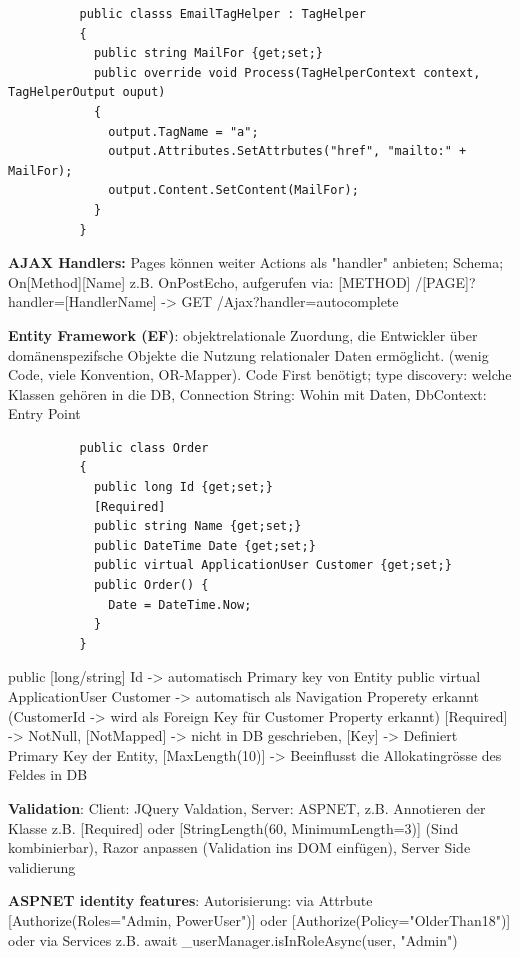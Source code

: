 \documentclass[10pt,landscape]{article}
\begin{document}
\begin{multicols}{3}
\begin{lstlisting}
          public classs EmailTagHelper : TagHelper 
          {
            public string MailFor {get;set;}
            public override void Process(TagHelperContext context, TagHelperOutput ouput)
            {
              output.TagName = "a";
              output.Attributes.SetAttrbutes("href", "mailto:" + MailFor);
              output.Content.SetContent(MailFor);
            }
          }
        \end{lstlisting}
        \textbf{AJAX Handlers:} Pages können weiter Actions als "handler" anbieten; Schema; On[Method][Name] z.B. OnPostEcho, aufgerufen via: [METHOD] /[PAGE]?handler=[HandlerName] -> GET /Ajax?handler=autocomplete

        \textbf{Entity Framework (EF)}: objektrelationale Zuordung, die Entwickler über domänenspezifsche Objekte die Nutzung relationaler Daten ermöglicht. (wenig Code, viele Konvention, OR-Mapper).
        Code First benötigt; type discovery: welche Klassen gehören in die DB, Connection String: Wohin mit Daten, DbContext: Entry Point
        \begin{lstlisting}
          public class Order
          {
            public long Id {get;set;}
            [Required]
            public string Name {get;set;}
            public DateTime Date {get;set;}
            public virtual ApplicationUser Customer {get;set;}
            public Order() {
              Date = DateTime.Now;
            }
          }
        \end{lstlisting}
        public [long/string] Id -> automatisch Primary key von Entity
        public virtual ApplicationUser Customer -> automatisch als Navigation Properety erkannt (CustomerId -> wird als Foreign Key für Customer Property erkannt)
        [Required] -> NotNull, [NotMapped] -> nicht in DB geschrieben, [Key] -> Definiert Primary Key der Entity, [MaxLength(10)] -> Beeinflusst die Allokatingrösse des Feldes in DB

        \textbf{Validation}: Client: JQuery Valdation, Server: ASPNET, z.B. Annotieren der Klasse z.B. [Required] oder [StringLength(60, MinimumLength=3)] (Sind kombinierbar), Razor anpassen (Validation ins DOM einfügen), Server Side validierung

        \textbf{ASPNET identity features}:         
        Autorisierung: via Attrbute [Authorize(Roles="Admin, PowerUser")] oder [Authorize(Policy="OlderThan18")] oder via Services z.B. await \_userManager.isInRoleAsync(user, "Admin")


\end{multicols}
\end{document}

